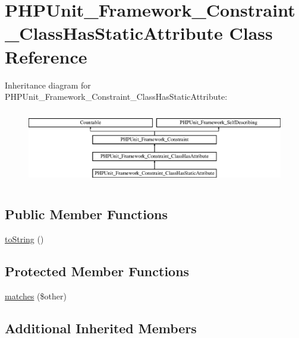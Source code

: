 \hypertarget{class_p_h_p_unit___framework___constraint___class_has_static_attribute}{}\section{P\+H\+P\+Unit\+\_\+\+Framework\+\_\+\+Constraint\+\_\+\+Class\+Has\+Static\+Attribute Class Reference}
\label{class_p_h_p_unit___framework___constraint___class_has_static_attribute}
Inheritance diagram for P\+H\+P\+Unit\+\_\+\+Framework\+\_\+\+Constraint\+\_\+\+Class\+Has\+Static\+Attribute\+:\begin{figure}[H]
\begin{center}
\leavevmode
\includegraphics[height=3.313610cm]{class_p_h_p_unit___framework___constraint___class_has_static_attribute}
\end{center}
\end{figure}
\subsection*{Public Member Functions}
\begin{DoxyCompactItemize}
\item 
\mbox{\hyperlink{class_p_h_p_unit___framework___constraint___class_has_static_attribute_a5558c5d549f41597377fa1ea8a1cefa3}{to\+String}} ()
\end{DoxyCompactItemize}
\subsection*{Protected Member Functions}
\begin{DoxyCompactItemize}
\item 
\mbox{\hyperlink{class_p_h_p_unit___framework___constraint___class_has_static_attribute_a9c9c337de483bbdbb9fa249a6c7c9cc5}{matches}} (\$other)
\end{DoxyCompactItemize}
\subsection*{Additional Inherited Members}


